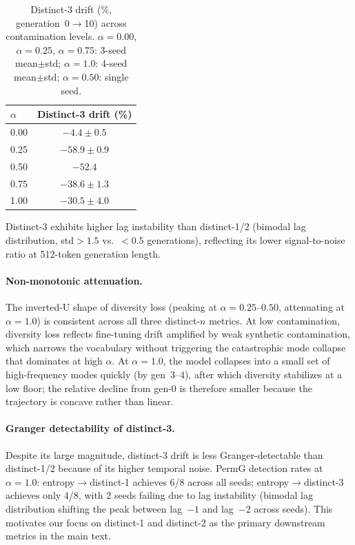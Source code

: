 \begin{table}[t]
\centering
\small
\caption{Distinct-3 drift (\%, generation~0$\to$10) across contamination levels. $\alpha{=}0.00$, $\alpha{=}0.25$, $\alpha{=}0.75$: 3-seed mean${\pm}$std; $\alpha{=}1.0$: 4-seed mean${\pm}$std; $\alpha{=}0.50$: single seed.}
\label{tab:distinct3_drift}
\begin{tabular}{lc}
\toprule
$\alpha$ & Distinct-3 drift (\%) \\
\midrule
0.00 & $-4.4{\pm}0.5$ \\
0.25 & $-58.9{\pm}0.9$ \\
0.50 & $-52.4$ \\
0.75 & $-38.6{\pm}1.3$ \\
1.00 & $-30.5{\pm}4.0$ \\
\bottomrule
\end{tabular}
\end{table}

Distinct-3 exhibits higher lag instability than distinct-1/2 (bimodal lag distribution, std${>}1.5$ vs.\ ${<}0.5$ generations), reflecting its lower signal-to-noise ratio at 512-token generation length.

\paragraph{Non-monotonic attenuation.}
The inverted-U shape of diversity loss (peaking at $\alpha{=}0.25$--$0.50$, attenuating at $\alpha{=}1.0$) is consistent across all three distinct-$n$ metrics.
At low contamination, diversity loss reflects fine-tuning drift amplified by weak synthetic contamination, which narrows the vocabulary without triggering the catastrophic mode collapse that dominates at high $\alpha$.
At $\alpha{=}1.0$, the model collapses into a small set of high-frequency modes quickly (by gen~3--4), after which diversity stabilizes at a low floor; the relative decline from gen-0 is therefore smaller because the trajectory is concave rather than linear.

\paragraph{Granger detectability of distinct-3.}
Despite its large magnitude, distinct-3 drift is less Granger-detectable than distinct-1/2 because of its higher temporal noise.
PermG detection rates at $\alpha{=}1.0$: entropy$\to$distinct-1 achieves 6/8 across all seeds; entropy$\to$distinct-3 achieves only 4/8, with 2 seeds failing due to lag instability (bimodal lag distribution shifting the peak between lag~$-1$ and lag~$-2$ across seeds).
This motivates our focus on distinct-1 and distinct-2 as the primary downstream metrics in the main text.


